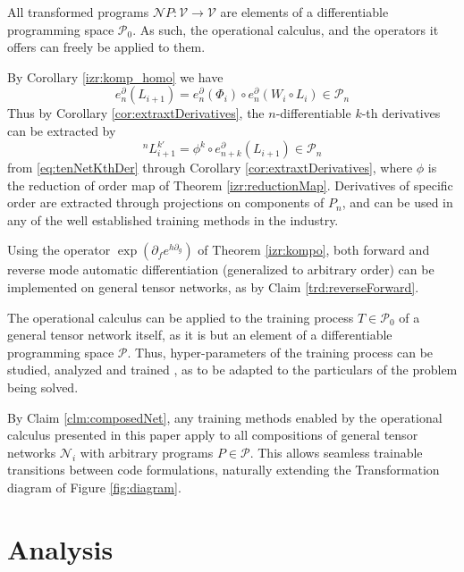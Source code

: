 \documentclass[smallcondensed]{svjour3}
\newcommand{\VV}{\mathcal{V}}
\newcommand{\NN}{\mathcal{N}}
\newcommand{\dP}{\mathcal{P}}
\newcommand{\D}{\partial}
\begin{document}
All transformed programs $\NN P:\VV\to\VV$ are elements of a differentiable programming space $\dP_0$. As such, the operational calculus, and the operators it offers can freely be applied to them.

By Corollary \ref{izr:komp_homo} we have
\begin{equation}\label{eq:tenNetKthDer}
e^\D_n(L_{i+1})=e^\D_n(\Phi_i)\circ e^\D_n(W_i\circ L_i)\in\dP_n
\end{equation}
Thus by Corollary \ref{cor:extraxtDerivatives}, the $n$-differentiable $k$-th derivatives can be extracted by
\begin{equation}
^{n}L_{i+1}^{k\prime}=\phi^k\circ e^\D_{n+k}(L_{i+1})\in\dP_n
\end{equation}
from \eqref{eq:tenNetKthDer} through Corollary \ref{cor:extraxtDerivatives}, where $\phi$ is the reduction of order map of Theorem \ref{izr:reductionMap}. Derivatives of specific order are extracted through projections on components of $P_n$, and can be used in any of the well established training methods in the industry. 

\begin{proposition}
Using the operator $\exp(\D_fe^{h\D_g})$ of Theorem \ref{izr:kompo}, both forward \cite{PcAD} and reverse \cite{ReverseAD} mode automatic differentiation (generalized to arbitrary order) can be implemented on general tensor networks, as by Claim \ref{trd:reverseForward}.
\end{proposition}

\begin{remark}
The operational calculus can be applied to the training process $T\in\dP_0$ of a general tensor network itself, as it is but an element of a differentiable programming space $\dP$. Thus, hyper-parameters of the training process \cite{HyperParams} can be studied, analyzed and trained \cite{hyper}, as to be adapted to the particulars of the problem being solved.
\end{remark}

By Claim \ref{clm:composedNet}, any training methods enabled by the operational calculus presented in this paper apply to all compositions of general tensor networks $\NN_i$ with arbitrary programs $P\in\dP$. This allows seamless trainable transitions between code formulations, naturally extending the Transformation diagram of Figure \ref{fig:diagram}. 
  
\section{Analysis}\label{sec:Analysis}
  
\end{document}
